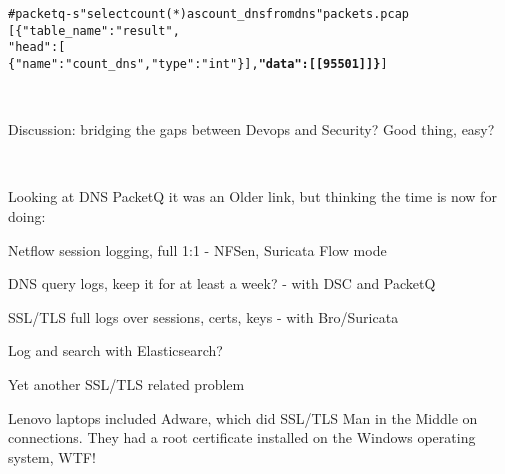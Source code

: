\documentclass[20pt,landscape,a4paper,footrule]{foils}
\begin{document}
\begin{alltt}
\small
# packetq -s "select count(*) as count_dns from dns" packets.pcap 
[ \{ "table_name": "result",
      "head": [
      \{ "name": "count_dns","type": "int" \} ],   {\bf "data": [ [95501] ] \}} ]
\end{alltt}

\\




Discussion: bridging the gaps between Devops and Security? Good thing, easy?

\\




Looking at DNS PacketQ it was an Older link, but thinking the time is now for doing:

\begin{list2}
\item Netflow session logging, full 1:1 - NFSen, Suricata Flow mode
\item DNS query logs, keep it for at least a week? - with DSC and PacketQ 
\item SSL/TLS full logs over sessions, certs, keys - with Bro/Suricata\\
\item Log and search with Elasticsearch?\\
\end{list2}




\centerline{Yet another SSL/TLS related problem}


Lenovo laptops included Adware, which did SSL/TLS Man in the Middle on connections.
They had a root certificate installed on the Windows operating system, WTF!
\end{document}
